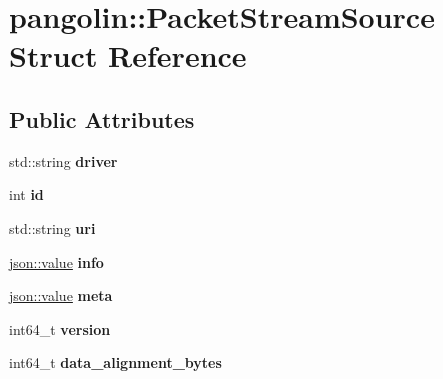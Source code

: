 \hypertarget{structpangolin_1_1_packet_stream_source}{}\section{pangolin\+:\+:Packet\+Stream\+Source Struct Reference}
\label{structpangolin_1_1_packet_stream_source}
\subsection*{Public Attributes}
\begin{DoxyCompactItemize}
\item 
std\+::string {\bfseries driver}\hypertarget{structpangolin_1_1_packet_stream_source_aaec90bc5f35a4fbacc2fb0ee4a8ea7e9}{}\label{structpangolin_1_1_packet_stream_source_aaec90bc5f35a4fbacc2fb0ee4a8ea7e9}

\item 
int {\bfseries id}\hypertarget{structpangolin_1_1_packet_stream_source_a67bda15da2041ed87748985db150792e}{}\label{structpangolin_1_1_packet_stream_source_a67bda15da2041ed87748985db150792e}

\item 
std\+::string {\bfseries uri}\hypertarget{structpangolin_1_1_packet_stream_source_ab767606ce98e4bfbc9f3f45eca36ae56}{}\label{structpangolin_1_1_packet_stream_source_ab767606ce98e4bfbc9f3f45eca36ae56}

\item 
\hyperlink{classpangolin_1_1json_1_1value}{json\+::value} {\bfseries info}\hypertarget{structpangolin_1_1_packet_stream_source_a7ca8ff4525ccc0888b522f7babc22e35}{}\label{structpangolin_1_1_packet_stream_source_a7ca8ff4525ccc0888b522f7babc22e35}

\item 
\hyperlink{classpangolin_1_1json_1_1value}{json\+::value} {\bfseries meta}\hypertarget{structpangolin_1_1_packet_stream_source_a5e98fe15917a51ee216e93dc0fb03267}{}\label{structpangolin_1_1_packet_stream_source_a5e98fe15917a51ee216e93dc0fb03267}

\item 
int64\+\_\+t {\bfseries version}\hypertarget{structpangolin_1_1_packet_stream_source_aa798c8c7f91f2e321a9df4a665d443ee}{}\label{structpangolin_1_1_packet_stream_source_aa798c8c7f91f2e321a9df4a665d443ee}

\item 
int64\+\_\+t {\bfseries data\+\_\+alignment\+\_\+bytes}\hypertarget{structpangolin_1_1_packet_stream_source_a68b8de8c48d952f23a94750fbe3bde9e}{}\label{structpangolin_1_1_packet_stream_source_a68b8de8c48d952f23a94750fbe3bde9e}


\end{DoxyCompactItemize}

